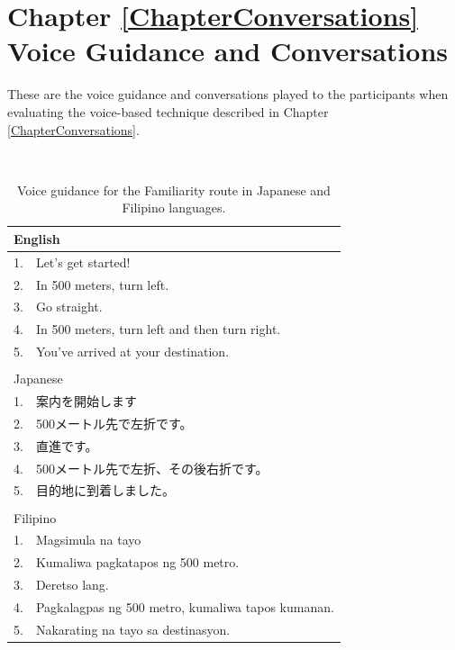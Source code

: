\chapter{Chapter \ref{ChapterConversations} Voice Guidance and Conversations}
\label{AppendixB}

These are the voice guidance and conversations played to the participants when evaluating the voice-based technique described in Chapter \ref{ChapterConversations}. 

\begin{table}[h]
\centering
\caption{Voice guidance for the Familiarity route in Japanese and Filipino languages.}~\label{tab:b-fami}
\begin{tabular}{ll}
\hline
\multicolumn{2}{l}{English}                            \\ \hline
1. & Let's get started!                                \\
2. & In 500 meters, turn left.                         \\
3. & Go straight.                                      \\
4. & In 500 meters, turn left and then turn right.     \\
5. & You've arrived at your destination.               \\ \hline
   &                                                   \\ \hline
\multicolumn{2}{l}{Japanese}                           \\ \hline
1. & 案内を開始します                                          \\
2. & 500メートル先で左折です。                                    \\
3. & 直進です。                                             \\
4. & 500メートル先で左折、その後右折です。                              \\
5. & 目的地に到着しました。                                       \\ \hline
   &                                                   \\ \hline
\multicolumn{2}{l}{Filipino}                           \\ \hline
1. & Magsimula na tayo                                 \\
2. & Kumaliwa pagkatapos ng 500 metro.                 \\
3. & Deretso lang.                                     \\
4. & Pagkalagpas ng 500 metro, kumaliwa tapos kumanan. \\
5. & Nakarating na tayo sa destinasyon.                \\ \hline
\end{tabular}
\end{table}

